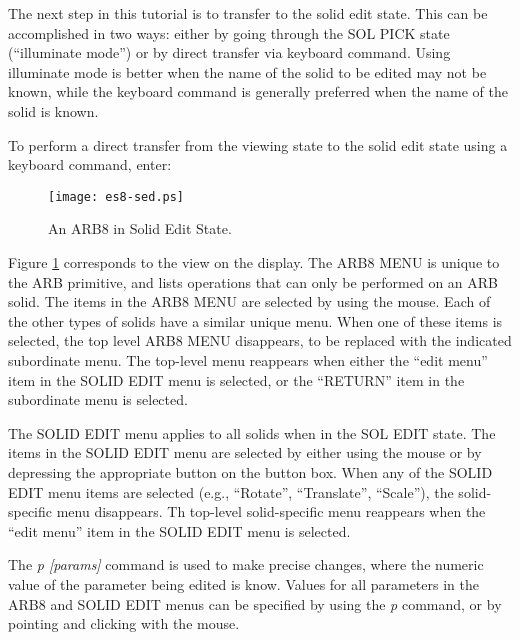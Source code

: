 The next step in this tutorial is to transfer to the solid edit state.
This can be accomplished in two ways:  either by going through
the SOL PICK state (``illuminate mode'') or by direct transfer via
keyboard command.
Using illuminate mode is better when the name of the solid to be
edited may not be known, while the keyboard command is generally
preferred when the name of the solid is known.


To perform a direct transfer from the viewing state to the solid edit state
using a keyboard command, enter:


\begin{figure}
\centering \texttt{[image: es8-sed.ps]}
\caption{An ARB8 in Solid Edit State.}
\label{es8-sed}
\end{figure}

Figure \ref{es8-sed} corresponds to the view on the display.
The ARB8 MENU is unique to the ARB primitive,
and lists operations that can only be performed on an ARB solid.
The items in the ARB8 MENU are
selected by using the mouse.
Each of the other types of solids have a
similar unique menu.
When one of these items is selected, the top level ARB8 MENU disappears,
to be replaced with the indicated subordinate menu.
The top-level menu reappears when either
the ``edit menu'' item in the SOLID EDIT menu is selected,
or the ``RETURN'' item in the subordinate menu is selected.

The  SOLID EDIT  menu applies to all
solids when in the SOL EDIT state.
The items in the  SOLID EDIT  menu are selected
by either using the mouse or by depressing the appropriate button on the
button box.
When any of the SOLID EDIT menu items are selected
(e.g., ``Rotate'', ``Translate'', ``Scale''), the solid-specific menu
disappears.
Th top-level solid-specific menu reappears when
the ``edit menu'' item in the SOLID EDIT menu is selected.

The {\em p [params]} command is used to
make precise changes, where the numeric value of the parameter being
edited is know.
Values for all parameters in the ARB8
and SOLID EDIT menus can be specified by using the {\em p} command,
or by pointing and clicking with the mouse.

